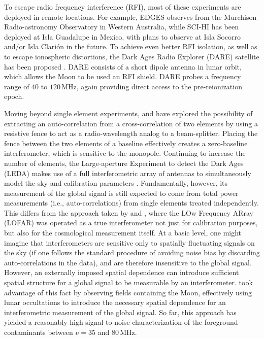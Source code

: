 \documentclass[twocolumn,apj,numberedappendix]{emulateapj}
\begin{document}
To escape radio frequency interference (RFI), most of these experiments are deployed in remote locations. For example, EDGES observes from the Murchison Radio-astronomy Observatory in Western Australia, while SCI-HI has been deployed at Isla Guadalupe in Mexico, with plans to observe at Isla Socorro and/or Isla Clari\'{o}n in the future.  To achieve even better RFI isolation, as well as to escape ionospheric distortions, the Dark Ages Radio Explorer (DARE) satellite has been proposed \citep{BurnsDARE,DAREMCMC}.  DARE consists of a short dipole antenna in lunar orbit, which allows the Moon to be used an RFI shield.  DARE probes a frequency range of $40$ to $120\,\textrm{MHz}$, again providing direct access to the pre-reionization epoch.

Moving beyond single element experiments, \citet{Mahesh_et_al2014} and \citet{Singh_et_al2015} have explored the possibility of extracting an auto-correlation from a cross-correlation of two elements by using a resistive fence to act as a radio-wavelength analog to a beam-splitter. Placing the fence between the two elements of a baseline effectively creates a zero-baseline interferometer, which is sensitive to the monopole. Continuing to increase the number of elements, the Large-aperture Experiment to detect the Dark Ages (LEDA) makes use of a full interferometric array of antennas to simultaneously model the sky and calibration parameters \citep{BernardiLEDA}.  Fundamentally, however, its measurement of the global signal is still expected to come from total power measurements (i.e., auto-correlations) from single elements treated independently.  This differs from the approach taken by \citet{McKinley_et_al2013} and \citet{VedanthamLOFAR2}, where the LOw Frequency ARray (LOFAR) was operated as a true interferometer not just for calibration purposes, but also for the cosmological measurement itself.  At a basic level, one might imagine that interferometers are sensitive only to spatially fluctuating signals on the sky (if one follows the standard procedure of avoiding noise bias by discarding auto-correlations in the data), and are therefore insensitive to the global signal.  However, an externally imposed spatial dependence can introduce sufficient spatial structure for a global signal to be measurable by an interferometer.  \citet{VedanthamLOFAR2} took advantage of this fact by observing fields containing the Moon, effectively using lunar occultations to introduce the necessary spatial dependence for an interferometric measurement of the global signal.  So far, this approach has yielded a reasonably high signal-to-noise characterization of the foreground contaminants between $\nu =35$ and $80\,\textrm{MHz}$.
\end{document}
